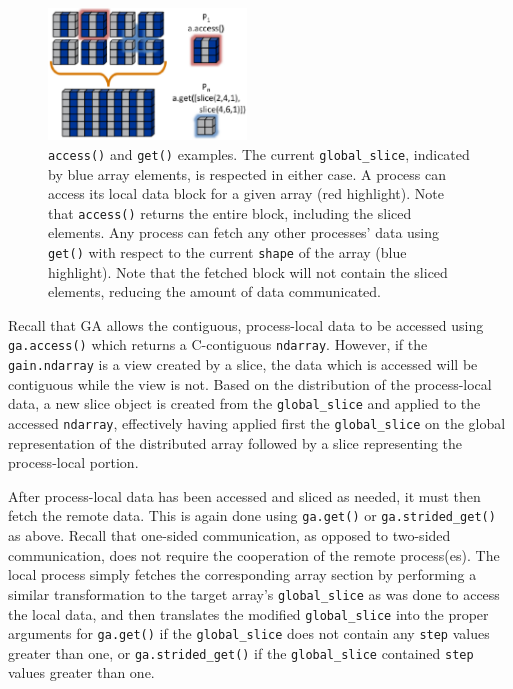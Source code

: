 \documentclass[preprint]{sigplanconf}
\begin{document}
\begin{figure}[htb]
\centering
\includegraphics[width=0.47\textwidth]{image5_crop.eps}
\caption{
\texttt{access()} and \texttt{get()} examples. The current
\texttt{global\_slice}, indicated by blue array elements, is respected in
either case. A process can access its local data block for a given array (red
highlight). Note that \texttt{access()} returns the entire block, including
the sliced elements.  Any process can fetch any other processes' data using
\texttt{get()} with respect to the current \texttt{shape} of the array (blue
highlight).  Note that the fetched block will not contain the sliced elements,
reducing the amount of data communicated.
}
\label{fig:accessget}
\end{figure}

Recall that GA allows the contiguous, process-local data to be accessed using
\verb=ga.access()= which returns a C-contiguous \verb=ndarray=. However, if
the \verb=gain.ndarray= is a view created by a slice, the data which is
accessed will be contiguous while the view is not. Based on the distribution
of the process-local data, a new slice object is created from the
\verb=global_slice= and applied to the accessed \verb=ndarray=, effectively
having applied first the \verb=global_slice= on the global representation of
the distributed array followed by a slice representing the process-local
portion.

After process-local data has been accessed and sliced as needed, it must then
fetch the remote data. This is again done using \verb=ga.get()= or
\verb=ga.strided_get()= as above.  Recall that one-sided communication, as
opposed to two-sided communication, does not require the cooperation of the
remote process(es). The local process simply fetches the corresponding array
section by performing a similar transformation to the target array's
\verb=global_slice= as was done to access the local data, and then translates
the modified \verb=global_slice= into the proper arguments for \verb=ga.get()=
if the \verb=global_slice= does not contain any \verb=step= values greater
than one, or \verb=ga.strided_get()= if the \verb=global_slice= contained
\verb=step= values greater than one.
\end{document}
